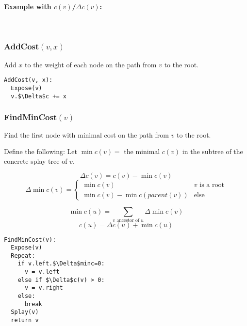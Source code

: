 \documentclass[a4paper]{article}
\begin{document}
\paragraph{Example with $c(v)$/$\Delta c(v)$:}\ \\

\subsubsection{AddCost\texorpdfstring{$(v, x)$}{(v, x)}}
Add $x$ to the weight of each node on the path from $v$ to the root.

\begin{lstlisting}[frame=L, mathescape=true]
AddCost(v, x):
  Expose(v)
  v.$\Delta$c += x
\end{lstlisting}

\subsubsection{FindMinCost\texorpdfstring{$(v)$}{(v)}}
Find the first node with minimal cost on the path from $v$ to the root.

Define the following:
Let $\min c(v)=$ the minimal $c(v)$ in the subtree of the concrete splay tree of $v$.

\[\Delta c(v)=c(v)-\min c(v)\]
\[
\Delta \min c(v)=\begin{cases}
  \min c(v) & \text{$v$ is a root}\\
  \min c(v) - \min c(parent(v)) & \text{else}
\end{cases}
\]

\[\min c(u)=\sum_{v\text{ ancestor of }u}\Delta \min c(v)\]
\[c(u)=\Delta c(u) + \min c(u)\]

\begin{lstlisting}[frame=L, mathescape=true]
FindMinCost(v):
  Expose(v)
  Repeat:
    if v.left.$\Delta$minc=0:
      v = v.left
    else if $\Delta$c(v) > 0:
      v = v.right
    else:
      break
  Splay(v)
  return v
\end{lstlisting}
\end{document}
